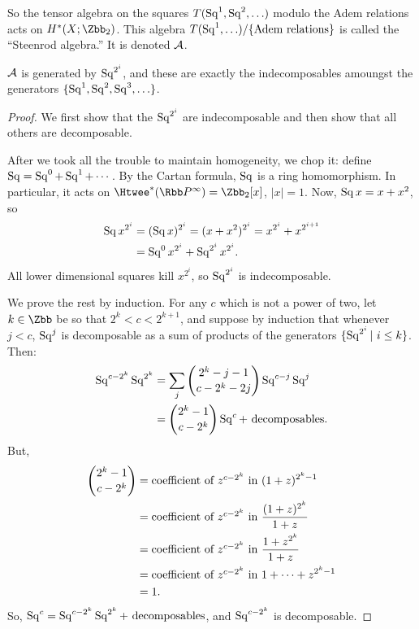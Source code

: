 So the tensor algebra on the squares $T(\operatorname{Sq}^1, \operatorname{Sq}^2, \ldots)$ modulo the Adem relations acts on $H^*(X; \Zbb_2)$.  This algebra $T(\operatorname{Sq}^1, \ldots) / \{\hbox{Adem relations}\}$ is called the ``Steenrod algebra.''  It is denoted $\mathcal{A}$.
\begin{lem}
$\mathcal{A}$ is generated by $\operatorname{Sq}^{2^i}$, and these are exactly the indecomposables amoungst the generators $\{\operatorname{Sq}^1,\operatorname{Sq}^2,\operatorname{Sq}^3,\ldots\}$.
\end{lem}
\begin{proof}
We first show that the $\operatorname{Sq}^{2^i}$ are indecomposable and then show that all others are decomposable.

After we took all the trouble to maintain homogeneity, we chop it: define $\operatorname{Sq} = \operatorname{Sq}^0 + \operatorname{Sq}^1 + \cdots$.  By the Cartan formula, $\operatorname{Sq}$ is a ring homomorphism.  In particular, it acts on $\Htwee^* (\RP^\infty) = \Zbb_2[x]$, $|x| = 1$.  Now, $\operatorname{Sq} x = x + x^2$, so
\begin{align*}
\operatorname{Sq} x^{2^i} & = (\operatorname{Sq} x)^{2^i} = (x + x^2)^{2^i} = x^{2^i} + x^{2^{i+1}} \\
& = \operatorname{Sq}^0 x^{2^i} + \operatorname{Sq}^{2^i} x^{2^i}.
\end{align*}
All lower dimensional squares kill $x^{2^i}$, so $\operatorname{Sq}^{2^i}$ is indecomposable.

We prove the rest by induction. For any $c$ which is not a power of two, let $k \in \Zbb$ be so that $2^k < c < 2^{k+1}$, and suppose by induction that whenever $j<c$, $\operatorname{Sq}^j$ is decomposable as a sum of products of the generators $\{\Sq^{2^i}|\ i\leq k\}$.  Then:
\begin{align*}
\operatorname{Sq}^{c-2^k} \operatorname{Sq}^{2^k} & = \sum_j \binom{2^k - j - 1}{c-2^k-2j} \operatorname{Sq}^{c-j}\operatorname{Sq}^j \\
& = \binom{2^k - 1}{c-2^k} \operatorname{Sq}^c + \mathrm{\ decomposables}.
\end{align*}
But,
\begin{align*}
\binom{2^k-1}{c-2^k} & = \hbox{coefficient of $z^{c-2^k}$ in}\ (1 + z)^{2^k-1} \\
& = \hbox{coefficient of $z^{c-2^k}$ in}\ \frac{(1+z)^{2^k}}{1+z} \\
& = \hbox{coefficient of $z^{c-2^k}$ in}\ \frac{1 + z^{2^k}}{1+z} \\
& = \hbox{coefficient of $z^{c-2^k}$ in}\ 1 + \cdots + z^{2^k - 1} \\
& = 1.
\end{align*}
So, $\operatorname{Sq}^c = \operatorname{Sq}^{c-2^k} \operatorname{Sq}^{2^k} + \mathrm{\ decomposables}$, and $\operatorname{Sq}^{c - 2^k}$ is decomposable.
\end{proof}

